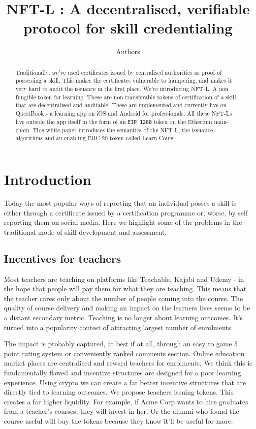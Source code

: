 \documentclass{article}
\author{Authors}
\title{NFT-L : A decentralised, verifiable protocol for skill credentialing}
\begin{document}
  \maketitle
  \begin{abstract}
    Traditionally, we've used certificates issued by centralised authorities as proof of possessing a skill.
    This makes the certificates vulnerable to hampering, and makes it very hard to audit the issuance in the first place.
    We're introducing NFT-L. A non fungible token for learning. These are non transferable tokens of certification of a skill that are decentralised and auditable.
    These are implemented and currently live on QuestBook - a learning app on iOS and Android for professionals. All these NFT-Ls live outside the app itself in the form of an \texttt{EIP 1268} token on the Etherium main-chain.
    This white-paper introduces the semantics of the NFT-L, the issuance algorithms and an enabling ERC-20 token called Learn Coins.
  \end{abstract}
  \section{Introduction}
    Today the most popular ways of reporting that an individual posses a skill is either through a certificate issued by a certification programme or, worse, by self reporting them on social media.
    Here we highlight some of the problems in the traditional mode of skill development and assessment. 
    \subsection{Incentives for teachers}
      Most teachers are teaching on platforms like Teachable, Kajabi and Udemy - in the hope that people will pay them for what they are teaching. 
      This means that the teacher cares only about the number of people coming into the course. The quality of course delivery and making an impact on the learners lives seems to be a distant secondary metric. Teaching is no longer about learning outcomes. It's turned into a popularity contest of attracting largest number of enrolments. 
   
      The impact is probably captured, at best if at all, through an easy to game 5 point rating system or conveniently ranked comments section.
      \break
       Online education market places are centralised and reward teachers for enrolments. We think this is fundamentally flawed and incentive structures are designed for a poor learning experience. Using crypto we can create a far better incentive structures that are directly tied to learning outcomes. We propose teachers issuing tokens. This creates a far higher liquidity. For example, if Acme Corp wants to hire graduates from a teacher's courses, they will invest in her. Or the alumni who found the course useful will buy the tokens because they know it'll be useful for more.
       
\end{document}
